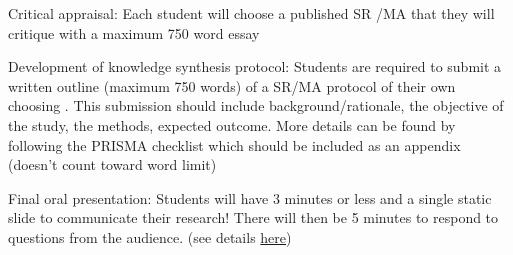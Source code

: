\documentclass[
  letterpaper,
  DIV=11,
  numbers=noendperiod]{scrartcl}
\begin{document}
{Critical appraisal:} Each student will choose a published SR /MA that
they will critique with a maximum 750 word essay ~

{Development of knowledge synthesis protocol:} Students are required to
submit a written outline (maximum 750 words) of a SR/MA protocol of
their own choosing . This submission should include
background/rationale, the objective of the study, the methods, expected
outcome. More details can be found by following the PRISMA checklist
which should be included as an appendix (doesn't count toward word
limit)~

{Final oral presentation:} Students will have 3 minutes or less and a
single static slide to communicate their research! There will then be 5
minutes to respond to questions from the audience. (see details
\href{https://www.mcgill.ca/involvement/channels/event/3mt-mt180-competition-2024-353339}{here})
\end{document}
